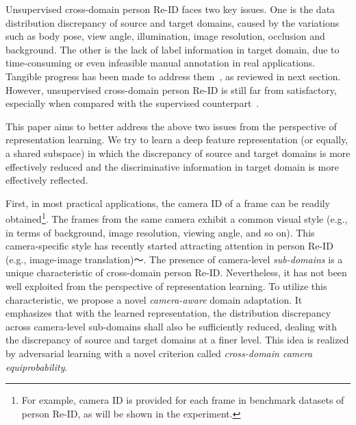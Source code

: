 \documentclass[10pt,twocolumn,letterpaper]{article}
\begin{document}
Unsupervised cross-domain person Re-ID faces two key issues. One is the data distribution discrepancy of source and target domains, caused by the variations such as body pose, view angle, illumination, image resolution, occlusion and background. The other is the lack of label information in target domain, due to time-consuming or even infeasible manual annotation in real applications. 
Tangible progress has been made to address them~\cite{DBLP:journals/tcsv/WangZLZ16,qi2018unsupervised,wei2018person,deng2018image,zhong2018generalizing,Bak_2018_ECCV}, as reviewed in next section. However, unsupervised cross-domain person Re-ID is still far from satisfactory, especially when compared with the supervised counterpart~\cite{DBLP:conf/cvpr/AhmedJM15,DBLP:conf/iccv/ZhengZY17,kalayeh2018human}. 
 
This paper aims to better address the above two issues from the perspective of representation learning. We try to learn a deep feature representation (or equally, a shared subspace) in which the discrepancy of source and target domains is more effectively reduced and the discriminative information in target domain is more effectively reflected. 

First, in most practical applications, the camera ID of a frame can be readily obtained\footnote{For example, camera ID is provided for each frame in benchmark datasets of person Re-ID, as will be shown in the experiment.}. The frames from the same camera exhibit a common visual style (e.g., in terms of background, image resolution, viewing angle, and so on). This camera-specific style has recently started attracting attention in person Re-ID (e.g., image-image translation)～\cite{zhong2018generalizing}. 
The presence of camera-level \textit{sub-domains} is a unique characteristic of cross-domain person Re-ID. Nevertheless, it has not been well exploited from the perspective of representation learning. To utilize this characteristic, we propose a novel \textit{camera-aware} domain adaptation. It emphasizes that with the learned representation, the distribution discrepancy across camera-level sub-domains shall also be sufficiently reduced, dealing with the discrepancy of source and target domains at a finer level. This idea is realized by adversarial learning with a novel criterion called \textit{cross-domain camera equiprobability}. 
\end{document}
